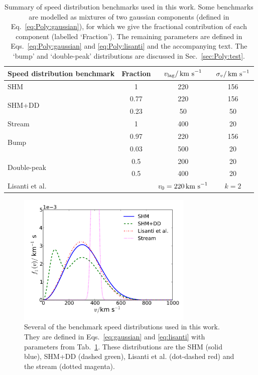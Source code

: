\begin{table}[t]
  \setlength{\extrarowheight}{2pt}
  \setlength{\tabcolsep}{3pt}
  \begin{center}
	\begin{tabular}{m{3cm}|ccc}
        \hline \hline
	Speed distribution benchmark & Fraction & $v_\textrm{lag} / \,\textrm{km s}^{-1}$ & $\sigma_v / \,\textrm{km s}^{-1}$ \\
        \hline
	SHM & 1 & 220 & 156 \\
	\hline
	\multirow{2}{*}{SHM+DD} & 0.77 & 220 & 156 \\
	& 0.23 & 50 & 50 \\
	\hline
	Stream & 1 & 400 & 20 \\
	\hline
	\multirow{2}{*}{Bump} & 0.97 & 220 & 156 \\
	& 0.03 & 500 & 20 \\
	\hline
	\multirow{2}{*}{Double-peak} & 0.5 & 200 & 20 \\
	& 0.5 & 400 & 20 \\
	\hline
	Lisanti et al. & & $v_0 = 220 \,\textrm{km s}^{-1}$ & $k = 2$ \\
        \hline \hline
	\end{tabular}
        
  \end{center}
\caption{Summary of speed distribution benchmarks used in this work. Some benchmarks are modelled as mixtures of two gaussian components (defined in Eq.~\ref{eq:Poly:gaussian}), for which we give the fractional contribution of each component (labelled `Fraction'). The remaining parameters are defined in Eqs.~\ref{eq:Poly:gaussian} and \ref{eq:Poly:lisanti} and the accompanying text. The `bump' and `double-peak' distributions are discussed in Sec.~\ref{sec:Poly:test}.}
\label{tab:Poly:distributions}
\end{table}

\begin{figure}[t]
\centering
  \includegraphics[width=0.75\textwidth]{Poly/SpeedDistributions-Ensemble.pdf}
  \caption{Several of the benchmark speed distributions used in this work. They are defined in Eqs.~\ref{eq:gaussian} and \ref{eq:lisanti} with parameters from Tab.~\ref{tab:Poly:distributions}. These distributions are the SHM (solid blue), SHM+DD (dashed green), Lisanti et al. (dot-dashed red) and the stream (dotted magenta).}
  \label{fig:Poly:Ensemble_distributions}
\end{figure}

